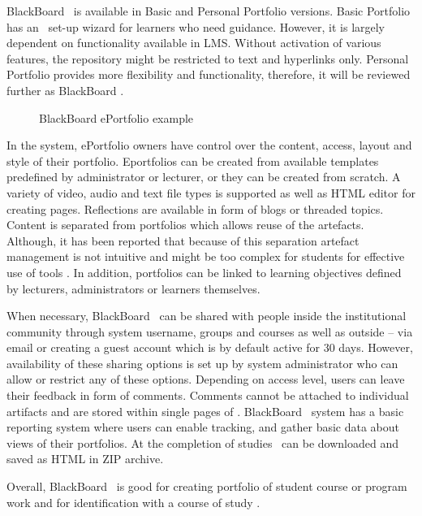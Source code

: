 BlackBoard \ep~is available in Basic and Personal Portfolio versions. Basic
Portfolio has an \ep~set-up wizard for learners who need guidance. However, it
is largely dependent on functionality available in LMS. Without activation of
various features, the repository might be restricted to text and hyperlinks
only. Personal Portfolio provides more flexibility and functionality, therefore,
it will be reviewed further as BlackBoard \ep.

\begin{figure}[htb]
\centering 
\setlength\fboxsep{0pt}
\setlength\fboxrule{0.5pt}
\fbox{\texttt{[image: CH4-F6-BB]}}
\caption[BlackBoard ePortfolio example]{BlackBoard ePortfolio example
\citep{UniversityofTorontoScarborough2010}}
\label{fig:bbep}
\end{figure}

In the system, ePortfolio owners have control over the content, access, layout
and style of their portfolio. Eportfolios can be created from available
templates predefined by administrator or lecturer, or they can be created from
scratch. A variety of video, audio and text file types is supported as well as
HTML editor for creating pages. Reflections are available in form of blogs or
threaded topics. Content is separated from portfolios which allows reuse of the
artefacts. Although, it has been reported that because of this separation
artefact management is not intuitive and might be too complex for students for
effective use of tools \citep{Clark2009}. In addition, portfolios can be linked
to learning objectives defined by lecturers, administrators or learners themselves.

When necessary, BlackBoard \ep~can be shared with people inside the
institutional community through system username, groups and courses as well as
outside -- via email or creating a guest account which is by default active for
30 days. However, availability of these sharing options is set up by system
administrator who can allow or restrict any of these options. Depending on
access level, users can leave their feedback in form of comments. Comments
cannot be attached to individual artifacts and are stored within single pages of
\ep. BlackBoard \ep~system has a basic reporting system where users can enable
tracking, and gather basic data about views of their portfolios. At the
completion of studies \ep~can be downloaded and saved as HTML in ZIP archive.

Overall, BlackBoard \ep~is good for creating portfolio of student course or
program work and for identification with a course of study
\citep{UniversityofTorontoScarborough2010}. 

